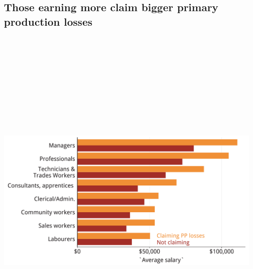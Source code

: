\documentclass[tikz]{standalone}\usepackage[]{graphicx}\usepackage[]{color}
\newenvironment{knitrout}{}{} %
\begin{document}
\subsection{Those earning more claim bigger primary production losses}
\begin{knitrout}
\color{fgcolor}
\includegraphics[width=13.2in,height=7.00in]{./Hot-property-CG-and-NG/CGT-NG-atlas/b5-palatino-atlas/PP-losers-salary-comparison-horiz-bar-1} 

\end{knitrout}
\end{document}
